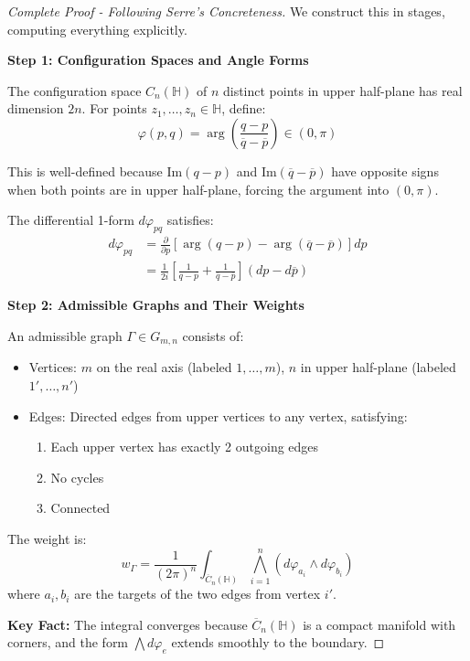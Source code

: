 \begin{proof}[Complete Proof - Following Serre's Concreteness]
We construct this in stages, computing everything explicitly.

\textbf{Step 1: Configuration Spaces and Angle Forms}

The configuration space $C_n(\mathbb{H})$ of $n$ distinct points in upper half-plane has real dimension $2n$. For points $z_1, \ldots, z_n \in \mathbb{H}$, define:
$$\varphi(p,q) = \arg\left(\frac{q - p}{\overline{q} - \overline{p}}\right) \in (0, \pi)$$

This is well-defined because $\text{Im}(q - p)$ and $\text{Im}(\overline{q} - \overline{p})$ have opposite signs when both points are in upper half-plane, forcing the argument into $(0, \pi)$.

The differential 1-form $d\varphi_{pq}$ satisfies:
\begin{align}
d\varphi_{pq} &= \frac{\partial}{\partial p}\left[\arg(q-p) - \arg(\overline{q}-\overline{p})\right] dp \\
&= \frac{1}{2i}\left[\frac{1}{q-p} + \frac{1}{\overline{q}-\overline{p}}\right](dp - d\overline{p})
\end{align}

\textbf{Step 2: Admissible Graphs and Their Weights}

An admissible graph $\Gamma \in G_{m,n}$ consists of:
\begin{itemize}
\item Vertices: $m$ on the real axis (labeled $1, \ldots, m$), $n$ in upper half-plane (labeled $1', \ldots, n'$)
\item Edges: Directed edges from upper vertices to any vertex, satisfying:
  \begin{enumerate}
  \item Each upper vertex has exactly 2 outgoing edges
  \item No cycles
  \item Connected
  \end{enumerate}
\end{itemize}

The weight is:
$$w_\Gamma = \frac{1}{(2\pi)^n} \int_{\overline{C}_n(\mathbb{H})} \bigwedge_{i=1}^n (d\varphi_{a_i} \wedge d\varphi_{b_i})$$
where $a_i, b_i$ are the targets of the two edges from vertex $i'$.

\textbf{Key Fact:} The integral converges because $\overline{C}_n(\mathbb{H})$ is a compact manifold with corners, and the form $\bigwedge d\varphi_e$ extends smoothly to the boundary.


\end{proof}
